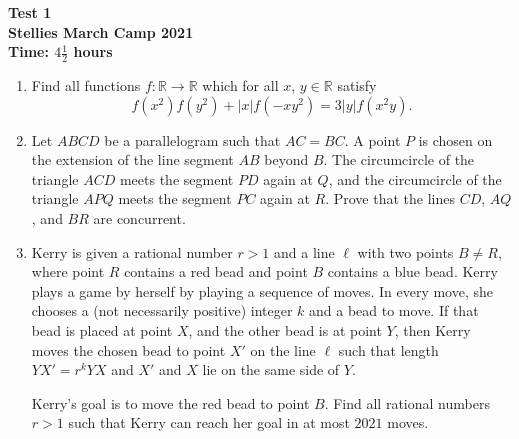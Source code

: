 \documentclass{article}
\begin{document}
\thispagestyle{empty}

\begin{center}
  \textbf{\Large Test 1}
  \\ \vspace{1em}
  \textbf{\large Stellies March Camp 2021}
  \\ \vspace{1em}
  \textbf{\large Time: $4\frac{1}{2}$ hours}
\end{center}

\bigskip

\begin{enumerate}[itemsep=12pt]

\item %
Find all functions $f : \mathbb{R} \to \mathbb{R}$ which for all $x$, $y \in \mathbb{R}$ satisfy
\[ f(x^{2})f(y^{2}) + |x|f(-xy^{2}) = 3|y|f(x^{2}y). \]

\item %
Let $ABCD$ be a parallelogram such that $AC = BC$.
A point $P$ is chosen on the extension of the line segment $AB$ beyond $B$.
The circumcircle of the triangle $ACD$ meets the segment $PD$ again at $Q$, and the circumcircle of the triangle $APQ$ meets the segment $PC$ again at $R$.
Prove that the lines $CD$, $AQ$, and $BR$ are concurrent.

\item %
Kerry is given a rational number $r > 1$ and a line $\ell$ with two points $B \neq R$, where point $R$ contains a red bead and point $B$ contains a blue bead.
Kerry plays a game by herself by playing a sequence of moves.
In every move, she chooses a (not necessarily positive) integer $k$ and a bead to move.
If that bead is placed at point $X$, and the other bead is at point $Y$, then Kerry moves the chosen bead to point $X'$ on the line $\ell$ such that length $YX' = r^k YX$ and $X'$ and $X$ lie on the same side of $Y$.

Kerry's goal is to move the red bead to point $B$.
Find all rational numbers $r > 1$ such that Kerry can reach her goal in at most $2021$ moves.

\end{enumerate}
\end{document}
